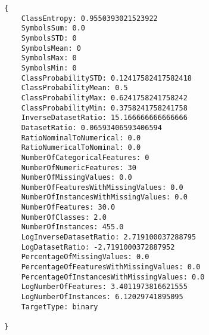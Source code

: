 \begin{lstlisting}
{
	ClassEntropy: 0.9550393021523922
    SymbolsSum: 0.0
    SymbolsSTD: 0
    SymbolsMean: 0
    SymbolsMax: 0
    SymbolsMin: 0
    ClassProbabilitySTD: 0.12417582417582418
    ClassProbabilityMean: 0.5
    ClassProbabilityMax: 0.6241758241758242
    ClassProbabilityMin: 0.3758241758241758
    InverseDatasetRatio: 15.166666666666666
    DatasetRatio: 0.06593406593406594
    RatioNominalToNumerical: 0.0
    RatioNumericalToNominal: 0.0
    NumberOfCategoricalFeatures: 0
    NumberOfNumericFeatures: 30
    NumberOfMissingValues: 0.0
    NumberOfFeaturesWithMissingValues: 0.0
    NumberOfInstancesWithMissingValues: 0.0
    NumberOfFeatures: 30.0
    NumberOfClasses: 2.0
    NumberOfInstances: 455.0
    LogInverseDatasetRatio: 2.719100037288795
    LogDatasetRatio: -2.7191000372887952
    PercentageOfMissingValues: 0.0
    PercentageOfFeaturesWithMissingValues: 0.0
    PercentageOfInstancesWithMissingValues: 0.0
    LogNumberOfFeatures: 3.4011973816621555
    LogNumberOfInstances: 6.12029741895095
    TargetType: binary

}
\end{lstlisting}

